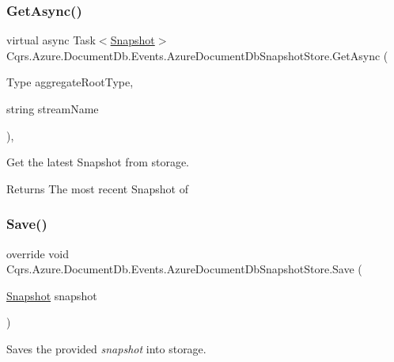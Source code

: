 \subsubsection{\texorpdfstring{Get\+Async()}{GetAsync()}}
{\footnotesize\ttfamily virtual async Task$<$\hyperlink{classCqrs_1_1Snapshots_1_1Snapshot}{Snapshot}$>$ Cqrs.\+Azure.\+Document\+Db.\+Events.\+Azure\+Document\+Db\+Snapshot\+Store.\+Get\+Async (\begin{DoxyParamCaption}\item[{Type}]{aggregate\+Root\+Type,  }\item[{string}]{stream\+Name }\end{DoxyParamCaption})\hspace{0.3cm}{\ttfamily [protected]}, {\ttfamily [virtual]}}



Get the latest Snapshot from storage. 

\begin{DoxyReturn}{Returns}
The most recent Snapshot of
\end{DoxyReturn}
\mbox{\label{classCqrs_1_1Azure_1_1DocumentDb_1_1Events_1_1AzureDocumentDbSnapshotStore_a52dd38e57e884db7529c8f57c3da7479_a52dd38e57e884db7529c8f57c3da7479}} 
\subsubsection{\texorpdfstring{Save()}{Save()}}
{\footnotesize\ttfamily override void Cqrs.\+Azure.\+Document\+Db.\+Events.\+Azure\+Document\+Db\+Snapshot\+Store.\+Save (\begin{DoxyParamCaption}\item[{\hyperlink{classCqrs_1_1Snapshots_1_1Snapshot}{Snapshot}}]{snapshot }\end{DoxyParamCaption})\hspace{0.3cm}{\ttfamily [virtual]}}



Saves the provided {\itshape snapshot}  into storage. 


